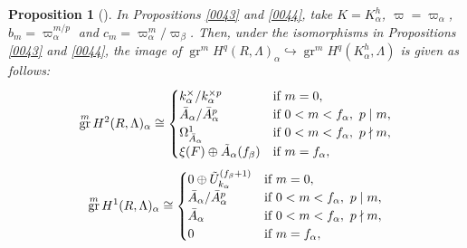 \documentclass{amsart}
\newtheorem{Prop}[Thm]{Proposition}
\theoremstyle{remark}
\numberwithin{equation}{subsection}
\newcommand{\into}{\hookrightarrow}
\DeclareMathOperator{\gr}{gr}
\begin{document}
\begin{Prop}[{\cite[(4.11)]{Sai86}}] \label{0075}
	In Propositions \ref{0043}
	and \ref{0044},
	take $K = K_{\alpha}^{h}$, $\varpi = \varpi_{\alpha}$,
	$b_{m} = \varpi_{\alpha}^{m / p}$ and $c_{m} = \varpi_{\alpha}^{m} / \varpi_{\beta}$.
	Then, under the isomorphisms in
	Propositions \ref{0043}
	and \ref{0044},
	the image of $\gr^{m} H^{q}(R, \Lambda)_{\alpha} \into \gr^{m} H^{q}(K_{\alpha}^{h}, \Lambda)$
	is given as follows:
		\[
				\gr^{m} H^{2}(R, \Lambda)_{\alpha}
			\cong
				\begin{cases}
							k_{\alpha}^{\times} / k_{\alpha}^{\times p}
					&	\text{if }
							m = 0,
					\\
							\Bar{A}_{\alpha} / \Bar{A}_{\alpha}^{p}
					&	\text{if }
							0 < m < f_{\alpha},\ p \mid m,
					\\
							\Omega_{\Bar{A}_{\alpha}}^{1}
					&	\text{if }
							0 < m < f_{\alpha},\ p \nmid m,
					\\
							\xi(F) \oplus \Tilde{A}_{\alpha}(f_{\beta})
					&	\text{if }
							m = f_{\alpha},
				\end{cases}
		\]
		\[
				\gr^{m} H^{1}(R, \Lambda)_{\alpha}
			\cong
				\begin{cases}
							0 \oplus \Tilde{U}_{k_{\alpha}}^{(f_{\beta} + 1)}
					&	\text{if }
							m = 0,
					\\
							\Bar{A}_{\alpha} / \Bar{A}_{\alpha}^{p}
					&	\text{if }
							0 < m < f_{\alpha},\ p \mid m,
					\\
							\Bar{A}_{\alpha}
					&	\text{if }
							0 < m < f_{\alpha},\ p \nmid m,
					\\
							0
					&	\text{if }
							m = f_{\alpha},
				\end{cases}
		\]
\end{Prop}
\end{document}
